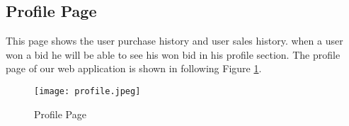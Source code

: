 \subsection{Profile Page}
This page shows the user purchase history and user sales history. when a user won a bid he will be able to see his won bid in his profile section. The profile page of our web application is shown in following Figure \ref{pp}.
\begin{figure}[!h]
    \centering
    \texttt{[image: profile.jpeg]}
    \caption{Profile Page}
    \label{pp}
\end{figure}
